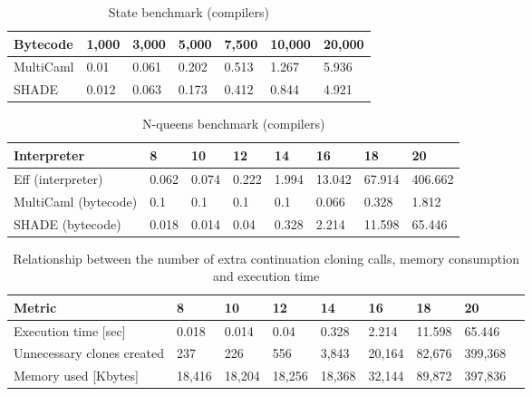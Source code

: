 %
\begin{table}[h]
\footnotesize
\centering
{\renewcommand{\arraystretch}{1.3}
\begin{tabular}{lllllll}
    \toprule
    Bytecode & 1,000 & 3,000 & 5,000 & 7,500 & 10,000 & 20,000 \\
    \midrule
    MultiCaml & 0.01 & 0.061 & 0.202 & 0.513 & 1.267 & 5.936 \\
    SHADE & 0.012 & 0.063 & 0.173 & 0.412 & 0.844 & 4.921 \\
    \bottomrule
\end{tabular}}
\caption{State benchmark (compilers)}
\label{tab:comp-state-measurements}
\end{table}
%
\begin{table}[h]
\footnotesize
\centering
{\renewcommand{\arraystretch}{1.3}
\begin{tabular}{llllllll}
    \toprule
    Interpreter & 8 & 10 & 12 & 14 & 16 & 18 & 20 \\
    \midrule
    Eff (interpreter) & 0.062 & 0.074 & 0.222 & 1.994 & 13.042 & 67.914 & 406.662 \\
    MultiCaml (bytecode) & 0.1 & 0.1 & 0.1 & 0.1 & 0.066 & 0.328 & 1.812 \\
    SHADE (bytecode) & 0.018 & 0.014 & 0.04 & 0.328 & 2.214 & 11.598 & 65.446 \\
    \bottomrule
\end{tabular}}
\caption{N-queens benchmark (compilers)}
\label{tab:nqueens-comp-measurements}
\end{table}
%
\begin{table}[h]
\footnotesize
\centering
{\renewcommand{\arraystretch}{1.3}
\begin{tabular}{lllllllll}
    \toprule
    Metric & 8 & 10 & 12 & 14 & 16 & 18 & 20 \\
    \midrule
    Execution time [sec]              & 0.018 & 0.014 & 0.04 & 0.328 & 2.214 & 11.598 & 65.446 \\
    Unnecessary clones created  & 237 & 226 & 556 & 3,843 & 20,164 & 82,676 & 399,368 \\
    Memory used [Kbytes]                 & 18,416 & 18,204 & 18,256 & 18,368 & 32,144 & 89,872 & 397,836 \\
    \bottomrule
\end{tabular}}
\caption{Relationship between the number of extra continuation cloning calls, memory consumption and execution time}
\label{tab:cloning}
\end{table}
